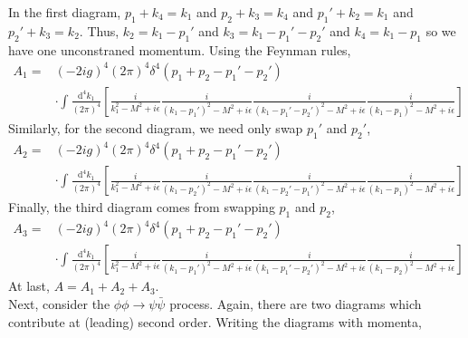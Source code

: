 \documentclass[12pt]{extarticle}
\begin{document}
\begin{enumerate}
In the first diagram, $p_1 + k_4 = k_1$ and $p_2 + k_3 = k_4$ and $p_1' + k_2 = k_1$ and $p_2' + k_3 = k_2$. Thus, $k_2 = k_1 - p_1'$ and $k_3 = k_1  - p_1' - p_2'$ and $k_4 = k_1  - p_1$ so we have one unconstraned momentum. Using the Feynman rules,
\begin{align*}
A_1 = & (-2ig)^4 (2 \pi)^4 \delta^4(p_1 + p_2 - p_1' - p_2')
\\
& \cdot \int \frac{\mathrm{d}^4 k_1}{(2 \pi)^4} \left[ \frac{i}{k_1^2 - M^2 + i \epsilon} \frac{i}{(k_1 - p_1')^2 - M^2 + i \epsilon}  \frac{i}{(k_1 - p_1' - p_2')^2 - M^2 + i \epsilon} \frac{i}{(k_1 - p_1)^2 - M^2 + i \epsilon}  \right] 
\end{align*}
Similarly, for the second diagram, we need only swap $p_1'$ and $p_2'$,
\begin{align*}
A_2 = & (-2ig)^4 (2 \pi)^4 \delta^4(p_1 + p_2 - p_1' - p_2')
\\
& \cdot \int \frac{\mathrm{d}^4 k_1}{(2 \pi)^4} \left[ \frac{i}{k_1^2 - M^2 + i \epsilon} \frac{i}{(k_1 - p_2')^2 - M^2 + i \epsilon}  \frac{i}{(k_1 - p_2' - p_1')^2 - M^2 + i \epsilon} \frac{i}{(k_1 - p_1)^2 - M^2 + i \epsilon}  \right] 
\end{align*}
Finally, the third diagram comes from swapping $p_1$ and $p_2$,
\begin{align*}
A_3 = & (-2ig)^4 (2 \pi)^4 \delta^4(p_1 + p_2 - p_1' - p_2')
\\
& \cdot \int \frac{\mathrm{d}^4 k_1}{(2 \pi)^4} \left[ \frac{i}{k_1^2 - M^2 + i \epsilon} \frac{i}{(k_1 - p_1')^2 - M^2 + i \epsilon}  \frac{i}{(k_1 - p_1' - p_2')^2 - M^2 + i \epsilon} \frac{i}{(k_1 - p_2)^2 - M^2 + i \epsilon}  \right] 
\end{align*}
At last, $A = A_1 + A_2 + A_3$.
\bigskip \\
Next, consider the $\phi \phi \to \psi \bar{\psi}$ process. Again, there are two diagrams which contribute at (leading) second order. Writing the diagrams with momenta, 


\end{enumerate}
\end{document}

